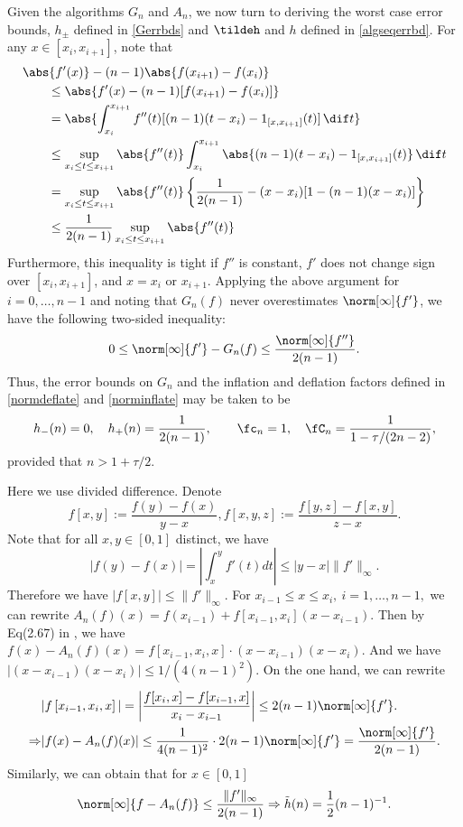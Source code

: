 Given the algorithms $G_n$ and $A_n$, we now turn to deriving the worst case error bounds, $h_{\pm}$ defined in \eqref{Gerrbds} and $\tildeh$ and $h$ defined in \eqref{algseqerrbd}.  For any $x \in [x_{i}, x_{i+1}]$, note that
\begin{align*}
\MoveEqLeft{\abs{f'(x)} - (n-1) \abs{f(x_{i+1})-f(x_i)}} \\
 & \le \abs{f'(x) - (n-1)[f(x_{i+1})-f(x_i)]} \\
&=\abs{ \int_{x_i}^{x_{i+1}} f''(t) [(n-1)(t-x_i) -  1_{[x,x_{i+1}]}(t)] \, \dif t} \\
& \le \sup_{x_i \le t \le x_{i+1}} \abs{f''(t)} \int_{x_i}^{x_{i+1}} \abs{  (n-1)(t-x_i) -  1_{[x,x_{i+1}]}(t)} \, \dif t \\
&=\sup_{x_i \le t \le x_{i+1}} \abs{f''(t)} \left \{\frac{1}{2(n-1)} - (x-x_i)[1-(n-1)(x-x_i)] \right\} \\
&\le \frac{1}{2(n-1)}\sup_{x_i \le t \le x_{i+1}} \abs{f''(t)}
\end{align*}
Furthermore, this inequality is tight if $f''$ is constant, $f'$ does not change sign over $[x_{i}, x_{i+1}]$, and $x=x_i$ or $x_{i+1}$.  Applying the above argument for $i=0, \ldots, n-1$ and noting that $G_n(f)$ never overestimates $\norm[\infty]{f'}$, we have the following two-sided inequality:
\[
0 \le \norm[\infty]{f'} - G_n(f) \le \frac{\norm[\infty]{f''}}{2(n-1)}.
\]
Thus, the error bounds on $G_n$ and the inflation and deflation factors defined in  \eqref{normdeflate} and \eqref{norminflate} may be taken to be
\begin{equation}\label{inflaapprox}
 h_{-}(n)=0, \quad h_{+}(n)=\frac{1}{2(n-1)}, \qquad \fc_n=1, \quad   \fC_n =\frac{1}{1 - \tau /(2n-2)},
\end{equation}
provided that $n>1+\tau/2$.

Here we use divided difference. Denote
$$f[x,y]:=\frac{f(y)-f(x)}{y-x},f[x,y,z]:=\frac{f[y,z]-f[x,y]}{z-x}.$$
Note that for all $x,y \in [0,1]$ distinct, we have
 $$|f(y)-f(x)|=\left|\int_{x}^{y}f'(t)dt\right| \leq |y-x|\|f'\|_{\infty}.$$
 Therefore we have $|f[x,y]|\leq \|f'\|_{\infty}.$
For $x_{i-1} \leq x \leq x_i, \ i=1, \ldots, n-1,$ we  can rewrite
$A_{n}(f)(x)=f\left(x_{i-1}\right)+f\left[x_{i-1},x_{i}\right]\left(x-x_{i-1}\right).$
Then by Eq(2.67) in \cite{walter}, we have
$
f(x)-A_{n}(f)(x)
=f\left[x_{i-1},x_{i},x\right]\cdot (x-x_{i-1})(x-x_i).
$
And we have
$\left|(x-x_{i-1})(x-x_{i})\right| \leq 1/(4(n-1)^2).$
On the one hand, we can rewrite
\begin{align*}&|f\left[x_{i-1},x_{i},x\right]|=\left|\frac{f[x_{i},x]-f[x_{i-1},x]}{x_i-x_{i-1}}\right|\leq2(n-1)\norm[\infty]{f'}.\\
\Rightarrow & |f(x)-A_{n}(f)(x)|\leq \frac{1}{4(n-1)^2}\cdot 2(n-1)\norm[\infty]{f'}=\frac{\norm[\infty]{f'}}{2(n-1)}.
\end{align*}
Similarly, we can obtain that for $x \in [0,1]$
$$\norm[\infty]{f-A_{n}(f)} \leq \frac{\|f'\|_{\infty}}{2(n-1)} \Rightarrow \tilde{h}(n)=\frac{1}{2}(n-1)^{-1}.$$

